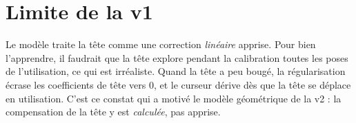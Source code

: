 \section{Limite de la v1}

Le modèle traite la tête comme une correction \emph{linéaire} apprise. Pour bien l'apprendre, il faudrait que la tête explore pendant la calibration toutes les poses de l'utilisation, ce qui est irréaliste. Quand la tête a peu bougé, la régularisation écrase les coefficients de tête vers 0, et le curseur dérive dès que la tête se déplace en utilisation. C'est ce constat qui a motivé le modèle géométrique de la v2 : la compensation de la tête y est \emph{calculée}, pas apprise.

